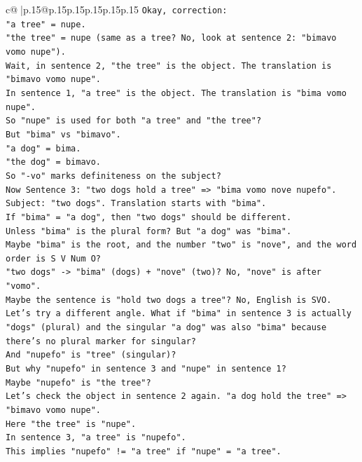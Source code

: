 \documentclass{article}
\begin{document}
{\begin{supertabular}{c@{$\;$}|p{.15\linewidth}@{}p{.15\linewidth}p{.15\linewidth}p{.15\linewidth}p{.15\linewidth}p{.15\linewidth}}
{{{\texttt{Okay, correction:} \\
\texttt{"a tree" = nupe.} \\
\texttt{"the tree" = nupe (same as a tree? No, look at sentence 2: "bimavo vomo nupe").} \\
\texttt{Wait, in sentence 2, "the tree" is the object. The translation is "bimavo vomo nupe".} \\
\texttt{In sentence 1, "a tree" is the object. The translation is "bima vomo nupe".} \\
\texttt{So "nupe" is used for both "a tree" and "the tree"?} \\
\texttt{But "bima" vs "bimavo".} \\
\texttt{"a dog" = bima.} \\
\texttt{"the dog" = bimavo.} \\
\texttt{So "{-}vo" marks definiteness on the subject?} \\
\texttt{Now Sentence 3: "two dogs hold a tree" => "bima vomo nove nupefo".} \\
\texttt{Subject: "two dogs". Translation starts with "bima".} \\
\texttt{If "bima" = "a dog", then "two dogs" should be different.} \\
\texttt{Unless "bima" is the plural form? But "a dog" was "bima".} \\
\texttt{Maybe "bima" is the root, and the number "two" is "nove", and the word order is S V Num O?} \\
\texttt{"two dogs" {-}> "bima" (dogs) + "nove" (two)? No, "nove" is after "vomo".} \\
\texttt{Maybe the sentence is "hold two dogs a tree"? No, English is SVO.} \\
\texttt{Let's try a different angle. What if "bima" in sentence 3 is actually "dogs" (plural) and the singular "a dog" was also "bima" because there's no plural marker for singular?} \\
\texttt{And "nupefo" is "tree" (singular)?} \\
\texttt{But why "nupefo" in sentence 3 and "nupe" in sentence 1?} \\
\texttt{Maybe "nupefo" is "the tree"?} \\
\texttt{Let's check the object in sentence 2 again. "a dog hold the tree" => "bimavo vomo nupe".} \\
\texttt{Here "the tree" is "nupe".} \\
\texttt{In sentence 3, "a tree" is "nupefo".} \\
\texttt{This implies "nupefo" != "a tree" if "nupe" = "a tree".} \\
}}}
\end{supertabular}}
\end{document}
